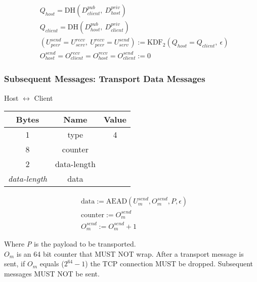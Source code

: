 \begin{align*}
    & Q_{host} = \text{DH}(D_{client}^{pub},\ D_{host}^{priv})\\
    & Q_{client} = \text{DH}(D_{host}^{pub},\ D_{client}^{priv})\\
    & (U_{peer}^{send} = U_{serv}^{recv},\ U_{peer}^{recv} = U_{serv}^{send}) := \text{KDF}_2(Q_{host} = Q_{client},
    \ \epsilon) \\
    & O_{host}^{send} = O_{client}^{recv} = O_{host}^{recv} = O_{client}^{send} := 0
\end{align*}

\subsubsection{Subsequent Messages: Transport Data Messages}

\begin{center}
    Host $\leftrightarrow$ Client\\
    \begin{tabular}{|c|c|c|}
        \hline
        \textbf{Bytes}     & \textbf{Name} & \textbf{Value} \\
        \hline
        1                  & type          & 4              \\
        \hline
        8                  & counter       &                \\
        \hline
        2                  & data-length   &                \\
        \hline
        \emph{data-length} & data          &                \\
        \hline
    \end{tabular}
\end{center}

\begin{align*}
    & \text{data} := \text{AEAD}(U_{m}^{send}, O_{m}^{send}, P, \epsilon)\\
    & \text{counter} := O_{m}^{send}\\
    & O_{m}^{send} := O_{m}^{send} + 1
\end{align*}


Where \emph{P} is the payload to be transported.\\

$O_{m}$ is an 64 bit counter that MUST NOT wrap. After a transport message is sent, if $O_{m}$ equals
($2^{64}-1$) the TCP connection MUST be dropped. Subsequent messages MUST NOT be sent. \\

